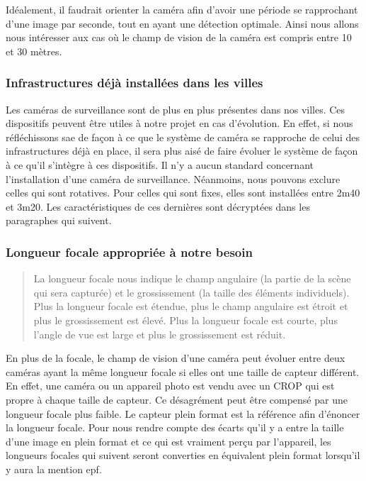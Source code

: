 Idéalement, il faudrait orienter la caméra afin d'avoir une période se rapprochant d'une image par seconde, tout en ayant une détection optimale.
Ainsi nous allons nous intéresser aux cas où le champ de vision de la caméra est compris entre 10 et 30 mètres.

\subsubsection{Infrastructures déjà installées dans les villes}
\label{sec:camera_infra}
Les caméras de surveillance sont de plus en plus présentes dans nos villes. Ces dispositifs peuvent être utiles à notre projet en cas d'évolution.
En effet, si nous réfléchissons \gls{sae} de façon à ce que le système de caméra se rapproche de celui des infrastructures déjà en place,
il sera plus aisé de faire évoluer le système de façon à ce qu'il s'intègre à ces dispositifs.
Il n'y a aucun standard concernant l'installation d'une caméra de surveillance. Néanmoins, nous pouvons exclure celles qui sont rotatives.
Pour celles qui sont fixes, elles sont installées entre 2m40 et 3m20. Les caractéristiques de ces dernières sont décryptées dans les paragraphes qui suivent.

\subsubsection{Longueur focale appropriée à notre besoin}
\label{sec:camera_focale}

\blockquote{La longueur focale nous indique le champ angulaire (la partie de la scène qui sera capturée)
    et le grossissement (la taille des éléments individuels).
    Plus la longueur focale est étendue, plus le champ angulaire est étroit et plus le grossissement est élevé.
    Plus la longueur focale est courte, plus l’angle de vue est large et plus le grossissement est réduit.}{\cite{focale}}

En plus de la focale, le champ de vision d'une caméra peut évoluer entre deux caméras ayant la même longueur focale
si elles ont une taille de capteur différent.
En effet, une caméra ou un appareil photo est vendu avec un \gls{CROP} qui est propre à chaque taille de capteur.
Ce désagrément peut être compensé par une longueur focale plus faible.
Le capteur plein format est la référence afin d'énoncer la longueur focale.
Pour nous rendre compte des écarts qu'il y a entre la taille d'une image en plein format et ce qui est vraiment perçu par l'appareil,
les longueurs focales qui suivent seront converties en équivalent plein format lorsqu'il y aura la mention \gls{epf}.

